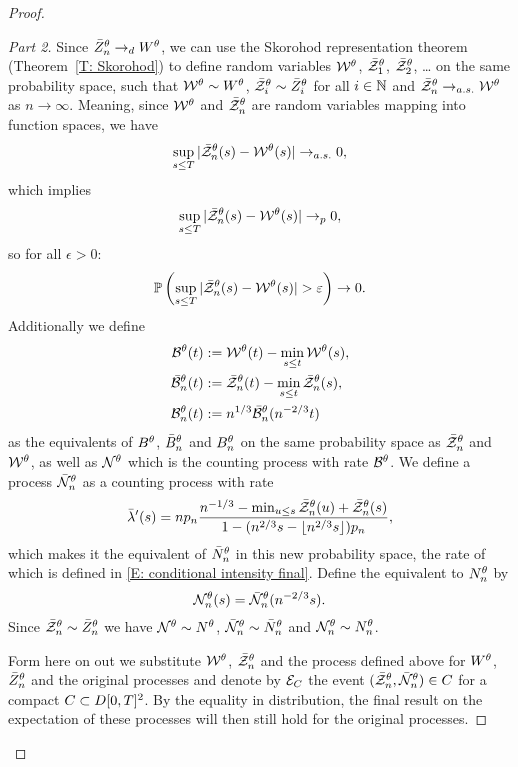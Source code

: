 \begin{proof}
\begin{proof}[Part 2]
Since $\bar{Z}^{\theta}_n \rightarrow_d W^{\theta}$, we can use the Skorohod representation theorem (Theorem~\ref{T: Skorohod}) to define random variables 
$\mathcal{W}^{\theta}$, $\bar{\mathcal{Z}}^{\theta}_1$, $\bar{\mathcal{Z}}^{\theta}_2$, \dots
on the same probability space, such that $\mathcal{W}^{\theta} \sim W^{\theta}$, $\bar{\mathcal{Z}}^{\theta}_i \sim \bar{Z}^{\theta}_i$ for all $i \in \mathbb{N}$
and $\bar{\mathcal{Z}}^{\theta}_n \rightarrow_{a.s.} \mathcal{W}^{\theta}$ as $n \rightarrow \infty$. \label{I: conv as}
Meaning, since $\mathcal{W}^{\theta}$ and $\bar{\mathcal{Z}}^{\theta}_n$ are random variables mapping into function spaces, we have
\begin{equation*}
\sup_{s \leq T} |\bar{\mathcal{Z}}^{\theta}_n(s) - \mathcal{W}^{\theta}(s)| \rightarrow_{a.s.} 0,
\end{equation*}
which  implies
\begin{equation*} 
\sup_{s \leq T} |\bar{\mathcal{Z}}^{\theta}_n(s) - \mathcal{W}^{\theta}(s)| \rightarrow_p 0,
\end{equation*}
so for all $\epsilon > 0$:
\begin{equation} \label{E: Prob(Event(delta)) 1}
\mathbb{P}\left( \sup_{s \leq T} |\bar{\mathcal{Z}}^{\theta}_n(s) - \mathcal{W}^{\theta}(s)| > \varepsilon \right) \rightarrow 0.
\end{equation}
Additionally we define \label{I: alt processes}
\begin{equation} 
	\begin{aligned}
	\mathcal{B}^{\theta}(t) &:= \mathcal{W}^{\theta}(t) - \min_{s \leq t}\mathcal{W}^{\theta}(s), \\
	\bar{\mathcal{B}}^{\theta}_n(t) &:= \bar{\mathcal{Z}}^{\theta}_n(t) - \min_{s \leq t}\bar{\mathcal{Z}}^{\theta}_n(s), \\
	\mathcal{B}_n^{\theta}(t) &:= n^{1 / 3}\bar{\mathcal{B}}^{\theta}_n(n^{-2 / 3}t)	
	\end{aligned}
\end{equation}
as the equivalents of $B^{\theta}$, $\bar{B}_n^{\theta}$ and $B_n^{\theta}$ on the same probability space as $\bar{\mathcal{Z}}^{\theta}_n$ and $\mathcal{W}^{\theta}$,
as well as $\mathcal{N}^{\theta}$ which is the counting process with rate $\mathcal{B}^{\theta}$.
We define a process $\bar{\mathcal{N}}_n^{\theta}$ as a counting process with rate
\begin{equation*}
\bar{\lambda}'(s) = n p_n \frac{n^{-1 / 3} - \min_{u \leq s} \bar{\mathcal{Z}}^{\theta}_n(u) + \bar{\mathcal{Z}}^{\theta}_n(s)}{1 - (n^{2 / 3}s - \lfloor n^{2 / 3}s\rfloor)p_n},
\end{equation*}
which makes it the equivalent of $\bar{N}_n^{\theta}$ in this new probability space, the rate of which is defined in \eqref{E: conditional intensity final}.
Define the equivalent to $N_n^{\theta}$ by 
\begin{equation}
	\mathcal{N}_n^{\theta}(s) = \bar{\mathcal{N}}_n^{\theta}(n^{-2 / 3}s).
\end{equation}
Since $\bar{\mathcal{Z}}^{\theta}_n \sim \bar{Z}^{\theta}_n$ we have $\mathcal{N}^{\theta} \sim N^{\theta}$, $\bar{\mathcal{N}}_n^{\theta} \sim \bar{N}_n^{\theta}$ and $\mathcal{N}_n^{\theta} \sim N_n^{\theta}$.

Form here on out we substitute $\mathcal{W}^{\theta}$, $\bar{\mathcal{Z}}^{\theta}_n$ and the process defined above for $W^{\theta}$, $\bar{Z}^{\theta}_n$ and the original processes
and denote by $\mathcal{E}_{C}$ the event $(\bar{\mathcal{Z}}^{\theta}_n, \bar{\mathcal{N}}_n^{\theta}) \in C$ for a compact $C \subset D[0, T]^2$.
By the equality in distribution, the final result on the expectation of these processes will then still hold for the original processes.


\end{proof}
\end{proof}
